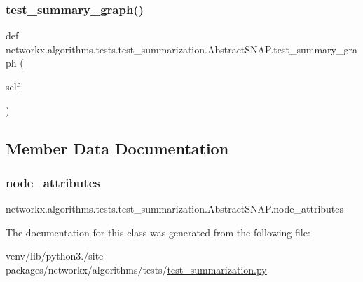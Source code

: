\subsubsection{\texorpdfstring{test\+\_\+summary\+\_\+graph()}{test\_summary\_graph()}}
{\footnotesize\ttfamily def networkx.\+algorithms.\+tests.\+test\+\_\+summarization.\+Abstract\+S\+N\+A\+P.\+test\+\_\+summary\+\_\+graph (\begin{DoxyParamCaption}\item[{}]{self }\end{DoxyParamCaption})}



\subsection{Member Data Documentation}
\mbox{\label{classnetworkx_1_1algorithms_1_1tests_1_1test__summarization_1_1AbstractSNAP_a5719046a4a1b144292b59aff299bf164}} 
\subsubsection{\texorpdfstring{node\+\_\+attributes}{node\_attributes}}
{\footnotesize\ttfamily networkx.\+algorithms.\+tests.\+test\+\_\+summarization.\+Abstract\+S\+N\+A\+P.\+node\+\_\+attributes\hspace{0.3cm}{\ttfamily [static]}}



The documentation for this class was generated from the following file\+:\begin{DoxyCompactItemize}
\item 
venv/lib/python3./site-\/packages/networkx/algorithms/tests/\hyperlink{test__summarization_8py}{test\+\_\+summarization.\+py}\end{DoxyCompactItemize}
